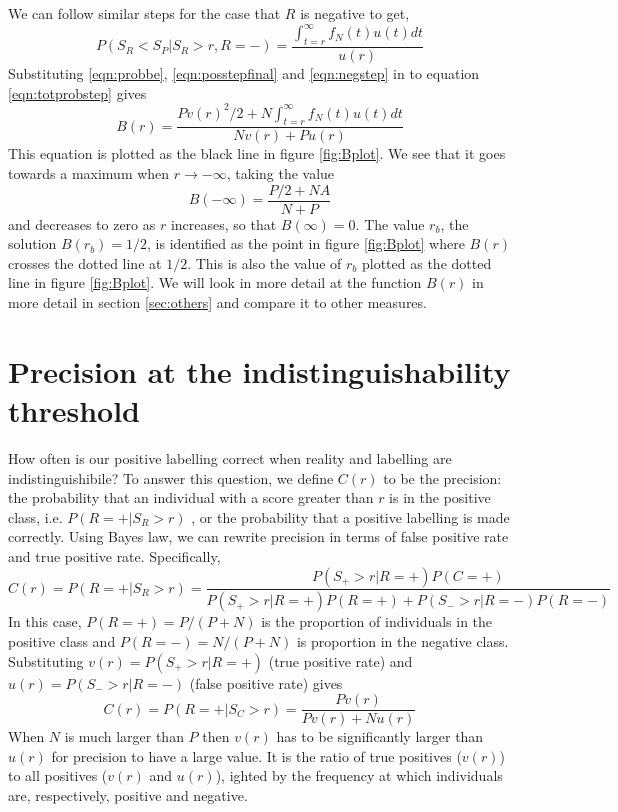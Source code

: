 \documentclass[preprint,12pt]{article}
\begin{document}
We can follow similar steps for the case that $R$ is negative to get,
\begin{equation}
P(S_R < S_P | S_{R} > r ,  R = -   ) = \frac{\int_{t=r}^\infty f_N(t) u(t) dt}{u(r)}  \label{eqn:negstep}
\end{equation}
Substituting \ref{eqn:probbe}, \ref{eqn:posstepfinal} and \ref{eqn:negstep} in to equation \ref{eqn:totprobstep} gives
\begin{equation}
B(r) = \frac{P v(r)^2/2 + N \int_{t=r}^\infty f_N(t) u(t) dt }{N v(r) + P u(r)} 
 \label{eqn:Bdef} 
\end{equation}
This equation is plotted as the black line in figure \ref{fig:Bplot}. We see that it goes towards a maximum when $r \rightarrow -\infty$, taking the value
\[
B(-\infty) = \frac{P/2 + N A}{N + P} 
\]
and decreases to zero as $r$ increases, so that $B(\infty) = 0$. The value $r_b$, the solution $B(r_b)=1/2$, is identified as the point in figure \ref{fig:Bplot} where $B(r)$ crosses the dotted line at $1/2$. This is also the value of $r_b$ plotted as the dotted line in figure \ref{fig:Bplot}. We will look in more detail at the function $B(r)$ in more detail in section \ref{sec:others} and compare it to other measures. 

\section{Precision at the indistinguishability threshold}

How often is our positive labelling correct when reality and labelling are indistinguishibile? To answer this question, we define $C(r)$ to be the precision: the probability that an individual with a score greater than $r$ is in the positive class, i.e. $P(R = + | S_R > r)$ , or the probability that a positive labelling is made correctly.  Using Bayes law, we can rewrite precision in terms of false positive rate and true positive rate. Specifically,
\[
C(r) = P(R = + | S_R > r) = \frac{P(S_+ > r | R = + ) P(C = + )}{P(S_+ > r | R = + ) P(R = + ) + P(S_- > r | R = - ) P(R = - )}
\]
In this case, $P(R = + ) = P/(P+N)$ is the proportion of individuals in the positive class and $P(R = - ) = N/(P+N)$ is proportion in the negative class. Substituting $v(r)=P(S_+ > r | R = + )$ (true positive rate) and $u(r) = P(S_- > r | R = - )$  (false positive rate) gives
\begin{equation}
C(r) = P(R = + | S_C > r) = \frac{P v(r)}{P v(r) + N u(r)} \label{precisionP}
\end{equation}
When $N$ is much larger than $P$ then $v(r)$ has to be significantly larger than $u(r)$ for precision to have a large value. It is the ratio of true positives ($v(r)$) to all positives ($v(r)$ and $u(r)$), ighted by the frequency at which individuals are, respectively, positive and negative. 
\end{document}
